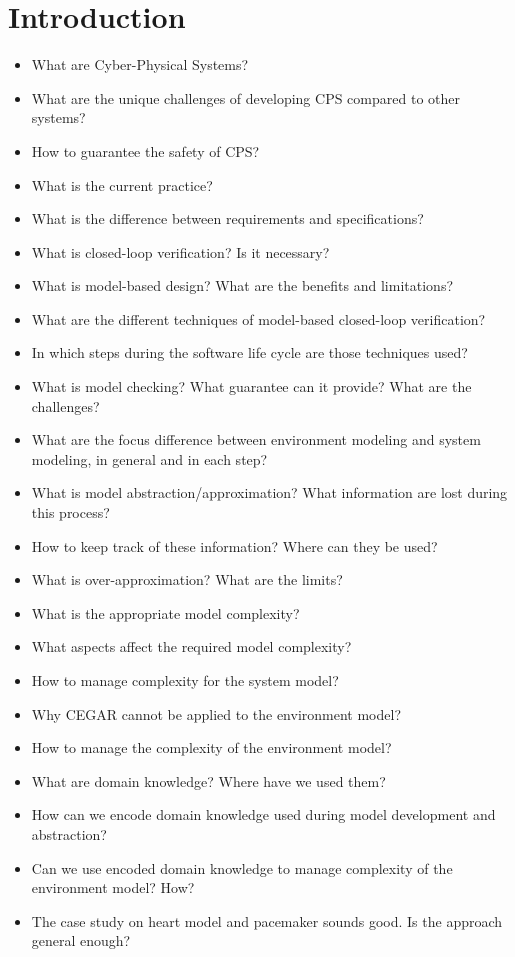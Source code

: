 \documentclass{llncs}
\begin{document}
\section{Introduction}
\begin{itemize}
	\item What are Cyber-Physical Systems?
    \item What are the unique challenges of developing CPS compared to other systems?
    \item How to guarantee the safety of CPS?
    \item What is the current practice?
    \item What is the difference between requirements and specifications?
    \item What is closed-loop verification? Is it necessary?
    \item What is model-based design? What are the benefits and limitations?
    \item What are the different techniques of model-based closed-loop verification? 
    \item In which steps during the software life cycle are those techniques used?
    \item What is model checking? What guarantee can it provide? What are the challenges?
    \item What are the focus difference between environment modeling and system modeling, in general and in each step?
    \item What is model abstraction/approximation? What information are lost during this process?
    \item How to keep track of these information? Where can they be used?
    \item What is over-approximation? What are the limits?
    \item What is the appropriate model complexity?
    \item What aspects affect the required model complexity?
    \item How to manage complexity for the system model?
    \item Why CEGAR cannot be applied to the environment model?
    \item How to manage the complexity of the environment model?
    \item What are domain knowledge? Where have we used them?
    \item How can we encode domain knowledge used during model development and abstraction?
    \item Can we use encoded domain knowledge to manage complexity of the environment model? How?
    \item The case study on heart model and pacemaker sounds good. Is the approach general enough?
\end{itemize}
\end{document}
